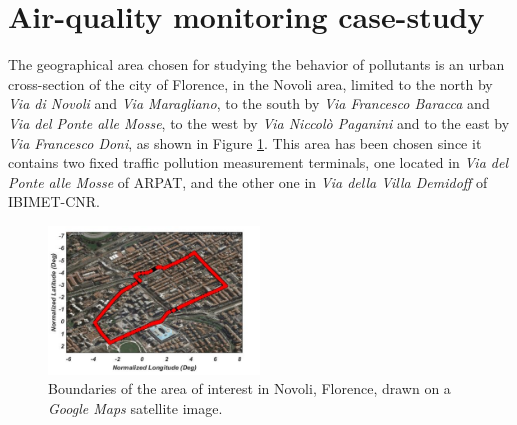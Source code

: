 \documentclass[journal]{IEEEtran}
\begin{document}
\section{Air-quality monitoring case-study}
The geographical area chosen for studying the behavior of pollutants is an urban cross-section of the city of Florence, in the Novoli area, limited to the north by \textit{Via di Novoli} and \textit{Via Maragliano}, to the south by \textit{Via Francesco Baracca} and \textit{Via del Ponte alle Mosse}, to the west by \textit{Via Niccol\`o Paganini} and to the east by \textit{Via Francesco Doni}, as shown in Figure \ref{fig:bound_sat}. This area has been chosen since it contains two fixed traffic pollution measurement terminals, one located in \textit{Via del Ponte alle Mosse} of ARPAT, and the other one in \textit{Via della Villa Demidoff} of IBIMET-CNR.
\begin{figure}[tb]
	\includegraphics[width=0.5\textwidth]{figure/FinalBound3.png}
	\caption{Boundaries of the area of interest in Novoli, Florence, drawn on a \textit{Google Maps} satellite image.}
	\label{fig:bound_sat}
\end{figure}

\end{document}
